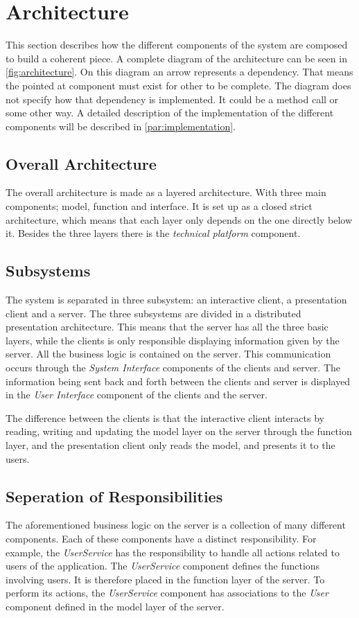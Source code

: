 \section{Architecture}
\label{sec:architecture}

This section describes how the different components of the system are
composed to build a coherent piece. A complete diagram of the architecture can be seen in \cref{fig:architecture}. On this diagram an arrow represents a dependency. That means the pointed at component must exist for other to be complete. The diagram does not specify how that dependency is implemented. It could be a method call or some other way. A detailed description of the implementation of the different components will be described in \cref{par:implementation}.

\subsection{Overall Architecture}
The overall architecture is made as a layered architecture. With three main components; model, function and interface. It is set up as a closed strict architecture, which means that each layer only depends on the one directly below it. Besides the three layers there is the \emph{technical platform} component.

\subsection{Subsystems}
The system is separated in three subsystem: an interactive client, a presentation client and a server. The three subsystems are divided in a distributed presentation architecture. This means that the server has all the three basic layers, while the clients is only responsible displaying information given by the server. All the business logic is contained on the
server. This communication occurs through the \textit{System Interface}
components of the clients and server. The information being sent back and
forth between the clients and server is displayed in the \textit{User Interface}
component of the clients and the server.

The difference between the clients is that the interactive client interacts by reading, writing and updating the model layer on the server through the function layer, and the presentation client only reads the model, and presents it to the users.

\subsection{Seperation of Responsibilities}
The aforementioned business logic on the server is a collection of
many different components. Each of these components have a distinct
responsibility. For example, the \textit{UserService} has the responsibility to
handle all actions related to users of the application. The
\textit{UserService} component defines the functions involving users. It is
therefore placed in the function layer of the server. To perform its
actions, the \textit{UserService} component has associations to the \textit{User}
component defined in the model layer of the server.

